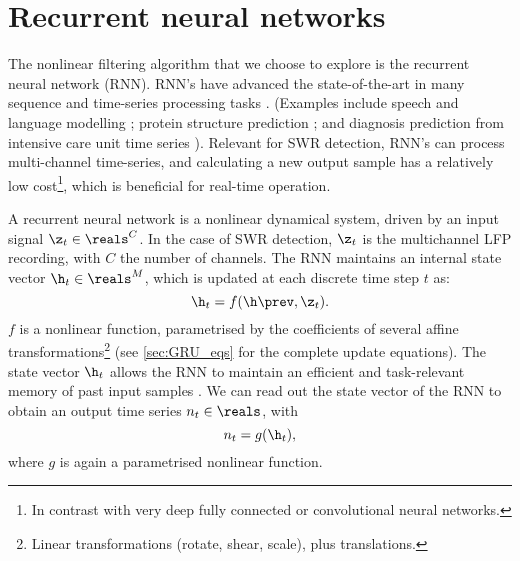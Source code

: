 \section{Recurrent neural networks}
\label{sec:RNNs}

The nonlinear filtering algorithm that we choose to explore is the recurrent neural network (RNN). RNN's have advanced the state-of-the-art in many sequence and time-series processing tasks \cite{Greff2017}. (Examples include speech and language modelling \cite{LeCun2015,Goodfellow2016}; protein structure prediction \cite{Sonderby2014}; and diagnosis prediction from intensive care unit time series \cite{Lipton2015}).\footnotemark{} Relevant for SWR detection, RNN's can process multi-channel time-series, and calculating a new output sample has a relatively low cost\footnote{In contrast with very deep fully connected or convolutional neural networks.}, which is beneficial for real-time operation.



A recurrent neural network is a nonlinear dynamical system, driven by an input signal $\z_t \in \reals^C$. In the case of SWR detection, $\z_t$ is the multichannel LFP recording, with $C$ the number of channels. The RNN maintains an internal state vector $\h_t \in \reals^M$, which is updated at each discrete time step $t$ as:
%
\begin{equation}
\label{eq:RNN_f}
\h_t = f(\h\prev, \z_t).
\end{equation}
%
$f$ is a nonlinear function, parametrised by the coefficients of several affine transformations\footnote{Linear transformations (rotate, shear, scale), plus translations.} (see \cref{sec:GRU_eqs} for the complete update equations). The state vector $\h_t$ allows the RNN to maintain an efficient and task-relevant memory of past input samples \cite{LeCun2015}.\footnotemark{} We can read out the state vector of the RNN to obtain an output time series $n_t \in \reals$, with
%
\begin{equation}
\label{eq:RNN_g}
n_t = g(\h_t),
\end{equation}
%
where $g$ is again a parametrised nonlinear function.

